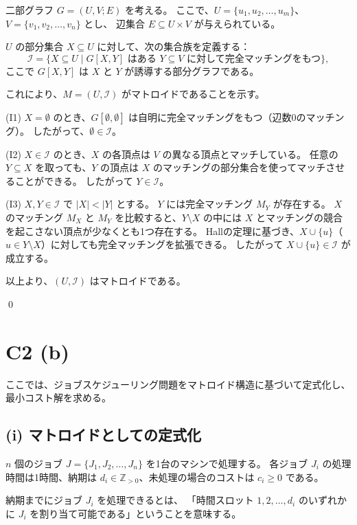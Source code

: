\documentclass[a4paper]{ltjsarticle}
\begin{document}
二部グラフ $G = (U, V; E)$ を考える。
ここで、$U = \{u_1, u_2, \dots, u_m\}$、$V = \{v_1, v_2, \dots, v_n\}$ とし、
辺集合 $E \subseteq U \times V$ が与えられている。

$U$ の部分集合 $X \subseteq U$ に対して、次の集合族を定義する：
\[
  \mathcal{I} = \{ X \subseteq U \mid G[X, Y] \text{ はある } Y \subseteq V \text{ に対して完全マッチングをもつ} \},
\]
ここで $G[X, Y]$ は $X$ と $Y$ が誘導する部分グラフである。

これにより、$M = (U, \mathcal{I})$ がマトロイドであることを示す。

(I1)
$X = \emptyset$ のとき、$G[\emptyset, \emptyset]$ は自明に完全マッチングをもつ（辺数0のマッチング）。
したがって、$\emptyset \in \mathcal{I}$。

(I2)
$X \in \mathcal{I}$ のとき、$X$ の各頂点は $V$ の異なる頂点とマッチしている。
任意の $Y \subseteq X$ を取っても、$Y$ の頂点は $X$ のマッチングの部分集合を使ってマッチさせることができる。
したがって $Y \in \mathcal{I}$。

(I3)
$X, Y \in \mathcal{I}$ で $|X| < |Y|$ とする。
$Y$ には完全マッチング $M_Y$ が存在する。
$X$ のマッチング $M_X$ と $M_Y$ を比較すると、$Y \setminus X$ の中には $X$ とマッチングの競合を起こさない頂点が少なくとも1つ存在する。
Hallの定理に基づき、$X \cup \{u\}$（$u \in Y \setminus X$）に対しても完全マッチングを拡張できる。
したがって $X \cup \{u\} \in \mathcal{I}$ が成立する。

以上より、$(U, \mathcal{I})$ はマトロイドである。

\qed

\section*{C2 (b)}

ここでは、ジョブスケジューリング問題をマトロイド構造に基づいて定式化し、最小コスト解を求める。

\subsection*{(i) マトロイドとしての定式化}

$n$ 個のジョブ $J = \{J_1, J_2, \dots, J_n\}$ を1台のマシンで処理する。
各ジョブ $J_i$ の処理時間は1時間、納期は $d_i \in \mathbb{Z}_{>0}$、未処理の場合のコストは $c_i \ge 0$ である。

納期までにジョブ $J_i$ を処理できるとは、
「時間スロット $1, 2, \dots, d_i$ のいずれかに $J_i$ を割り当て可能である」ということを意味する。
\end{document}

